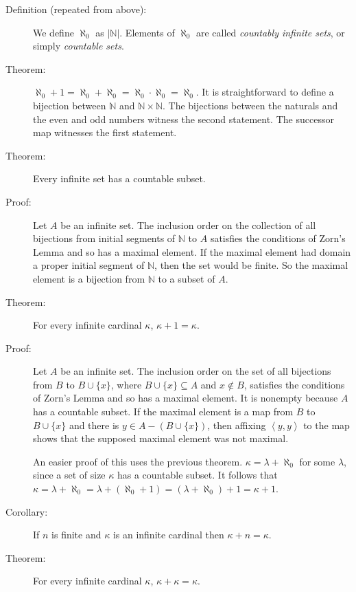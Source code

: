 \documentclass[12pt]{book}
\begin{document}
\begin{description}
\item[Definition (repeated from above):]   We define $\aleph_0$ as
$|\mathbb N|$.  Elements of $\aleph_0$ are called  {\em countably infinite
sets\/}, or simply {\em countable sets\/}.

\item[Theorem:] $\aleph_0+1 = \aleph_0+\aleph_0 = \aleph_0 \cdot
\aleph_0 = \aleph_0$.  It is straightforward to define a bijection
between $\mathbb N$ and $\mathbb N\times \mathbb N$.  The bijections
between the naturals and the even and odd numbers witness the second
statement.  The successor map witnesses the first statement.


\item[Theorem:]  Every infinite set has a countable subset.

\item[Proof:] Let $A$ be an infinite set.  The inclusion order on the
collection of all bijections from initial segments of $\mathbb N$ to
$A$ satisfies the conditions of Zorn's Lemma and so has a maximal
element.  If the maximal element had domain a proper initial segment
of $\mathbb N$, then the set would be finite.  So the maximal element
is a bijection from $\mathbb N$ to a subset of $A$.

\item[Theorem:]  For every infinite cardinal $\kappa$, $\kappa+1 = \kappa$.

\item[Proof:] Let $A$ be an infinite set.  The inclusion order on the
set of all bijections from $B$ to $B \cup \{x\}$, where $B \cup \{x\}
\subseteq A$ and $x \not\in B$, satisfies the conditions of Zorn's
Lemma and so has a maximal element.  It is nonempty because $A$ has a
countable subset.  If the maximal element is a map from $B$ to $B \cup
\{x\}$ and there is $y \in A-(B\cup \{x\})$, then affixing
$\left<y,y\right>$ to the map shows that the supposed maximal element
was not maximal.

An easier proof of this uses the previous theorem.  $\kappa = \lambda+\aleph_0$ for some $\lambda$, since a set of size $\kappa$ has a countable subset.  It follows
that $\kappa=\lambda+\aleph_0=\lambda+(\aleph_0+1)=(\lambda+\aleph_0)+1=\kappa+1$.

\item[Corollary:] If $n$ is finite and $\kappa$ is an infinite
cardinal then $\kappa+n = \kappa$.

\item[Theorem:] For every infinite cardinal $\kappa$,
$\kappa+\kappa=\kappa$.


\end{description}
\end{document}
